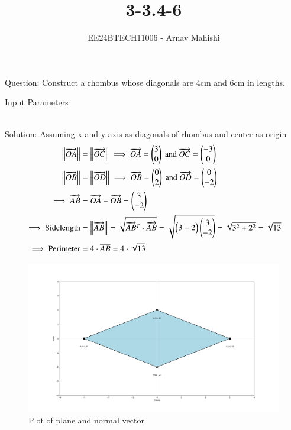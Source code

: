 \documentclass[journal]{IEEEtran}
\begin{document}

\vspace{3cm}

\title{3-3.4-6}
\author{EE24BTECH11006 - Arnav Mahishi}
{\let\newpage\relax\maketitle}

\renewcommand{\thefigure}{\theenumi}
\renewcommand{\thetable}{\theenumi}
\setlength{\intextsep}{10pt} %


\renewcommand{\thetable}{\theenumi}
Question: Construct a rhombus whose diagonals are $4$cm and $6$cm in lengths.\\
\begin{table}[h!]    
  \centering
  
  \caption{Input Parameters}
\end{table}\\
Solution: Assuming x and y axis as diagonals of rhombus and center as origin\\
\begin{align}
\left\lVert\overrightarrow{OA}\right\rVert&=\left\lVert\overrightarrow{OC}\right\rVert\implies \overrightarrow{OA}=\begin{pmatrix}3\\0\end{pmatrix}\text{ and }\overrightarrow{OC}=\begin{pmatrix}-3\\0\end{pmatrix}\\
\left\lVert\overrightarrow{OB}\right\rVert&=\left\lVert\overrightarrow{OD}\right\rVert\implies \overrightarrow{OB}=\begin{pmatrix}0\\2\end{pmatrix}\text{ and }\overrightarrow{OD}=\begin{pmatrix}0\\-2\end{pmatrix}\\
\implies\overrightarrow{AB}&=\overrightarrow{OA}-\overrightarrow{OB}=\begin{pmatrix}3\\-2\end{pmatrix}\\
\implies\text{Sidelength}&=\left\lVert\overrightarrow{AB}\right\rVert=\sqrt{\overrightarrow{AB}^T\cdot\overrightarrow{AB}}=\sqrt{\begin{pmatrix}3 -2\end{pmatrix}\begin{pmatrix}3\\-2\end{pmatrix}}=\sqrt{3^2+2^2}=\sqrt{13}\\
\implies\text{Perimeter}&=4\cdot\overline{AB}=4\cdot\sqrt{13}
\end{align}
\begin{figure}[h!]
   \centering
   \includegraphics[width=0.7\linewidth]{figs/Figure_1.png}
   \caption{Plot of plane and normal vector}
   \label{stemplot}
\end{figure}
\end{document}
